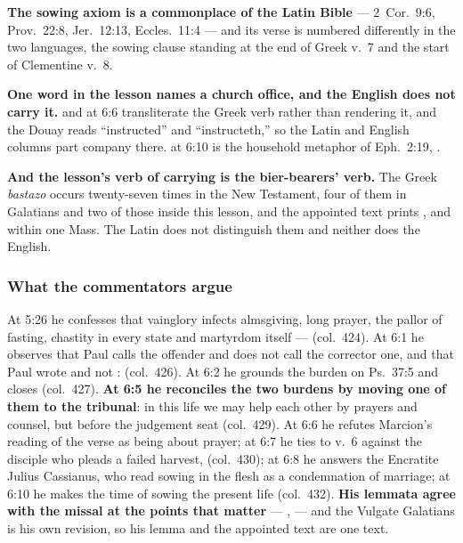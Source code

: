 \textbf{The sowing axiom is a commonplace of the Latin Bible} --- 2~Cor.\ 9:6,
Prov.\ 22:8, Jer.\ 12:13, Eccles.\ 11:4 --- and its verse is numbered differently
in the two languages, the sowing clause standing at the end of Greek v.~7 and the
start of Clementine v.~8.

\textbf{One word in the lesson names a church office, and the English does not
carry it.}  and  at 6:6 transliterate the
Greek verb rather than rendering it, and the Douay reads ``instructed'' and
``instructeth,'' so the Latin and English columns part company there.
 at 6:10 is the household metaphor of Eph.\ 2:19,
.

\textbf{And the lesson's verb of carrying is the bier-bearers' verb.} The Greek
\emph{bastazo} occurs twenty-seven times in the New Testament, four of them in
Galatians and two of those inside this lesson, and the appointed text prints
,  and  within one Mass. The
Latin does not distinguish them and neither does the English.

\subsubsection*{What the commentators argue}

\begin{witnessnote}
 At 5:26 he confesses that vainglory infects
almsgiving, long prayer, the pallor of fasting, chastity in every state and
martyrdom itself ---  (col.~424). At 6:1 he observes
that Paul calls the offender  and does not call the corrector one, and
that Paul wrote  and not :  (col.~426). At 6:2 he grounds the burden on Ps.~37:5 and
closes 
(col.~427). \textbf{At 6:5 he reconciles the two burdens by moving one of them to
the tribunal}: in this life we may help each other by prayers and counsel, but
before the judgement seat  (col.~429). At 6:6 he refutes
Marcion's reading of the verse as being about prayer; at 6:7 he ties  to v.~6 against the disciple who pleads a failed harvest,
 (col.~430); at 6:8 he answers the Encratite Julius Cassianus, who read
sowing in the flesh as a condemnation of marriage; at 6:10 he makes the time of
sowing the present life (col.~432). \textbf{His lemmata agree with the missal at
the points that matter} --- ,  --- and the Vulgate Galatians is his own revision, so his lemma and the
appointed text are one text.
\end{witnessnote}

